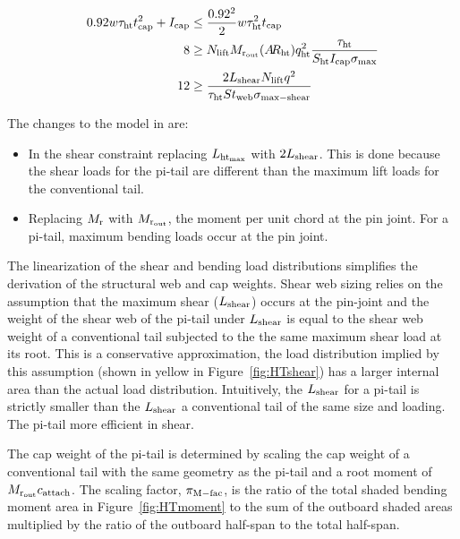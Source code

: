 \begin{align}
    0.92 w\tau_{\rm{ht}} t_{\rm{cap}}^2 + I_{\rm{cap}} &\leq \frac{0.92^2}{2}w\tau_{\rm{ht}}^2t_{\rm{cap}}\\
    8 &\geq N_{\rm{lift}}M_{\rm{r}_{\rm{out}}}(A\hspace{-2.0pt}R_{\rm{ht}})q_{\rm{ht}}^2\frac{\tau_{\rm{ht}}}{S_{\rm{ht}} I_{\rm{cap}}\sigma_{\rm{max}}}\\
    12 &\geq \frac{2L_{\rm{shear}} N_{\rm{lift}} q^2}{\tau_{\rm{ht}} S t_{\rm{web}} \sigma_{\rm{max-shear}}}
\end{align}

The changes to the model in \cite{gp_ac_design} are:
\begin{itemize}
    \item In the shear constraint replacing $L_{\rm{ht}_{\rm{max}}}$ with $2L_{\rm{shear}}$. 
This is done because the shear loads for the pi-tail are different than the 
maximum lift loads for the conventional tail. 
    \item Replacing $M_{\rm{r}}$ with $M_{\rm{r}_{\rm{out}}}$, the moment per unit chord at the 
pin joint. For a pi-tail, maximum bending loads occur at the pin joint.
\end{itemize}

The linearization of the shear and bending load distributions simplifies the 
derivation of the structural web and cap weights. Shear web sizing relies on the 
assumption that the maximum shear ($L_{\rm{shear}}$) occurs at the pin-joint and the 
weight of the shear web of the pi-tail under $L_{\rm{shear}}$ is equal to the shear 
web weight of a conventional tail subjected to the the same maximum shear load 
at its root. This is a conservative approximation, the load distribution implied 
by this assumption (shown in yellow in Figure~\ref{fig:HTshear}) has a larger 
internal area than the actual load distribution. Intuitively, the $L_{\rm{shear}}$ 
for a pi-tail is strictly smaller than the $L_{\rm{shear}}$ a conventional tail of 
the same size and loading. The pi-tail more efficient in shear.

The cap weight of the pi-tail is determined by scaling the cap weight of a 
conventional tail with the same geometry as the pi-tail and a root moment of 
$M_{\rm{r}_{\rm{out}}} c_{\rm{attach}}$. The scaling factor, $\pi_{\rm{M-fac}}$, is the ratio of the 
total shaded bending moment area in Figure~\ref{fig:HTmoment} to the sum of the 
outboard shaded areas multiplied by the ratio of the outboard half-span to the 
total half-span.

